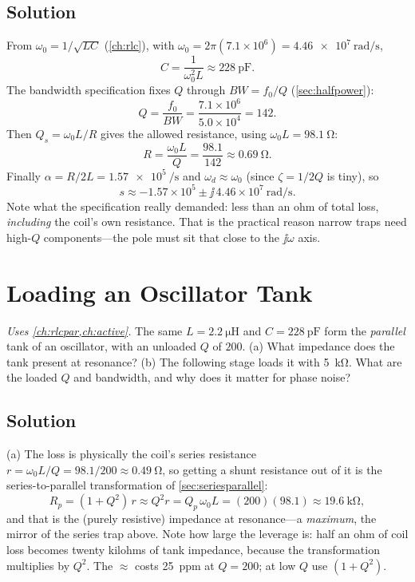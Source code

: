 \subsection*{Solution}
From \(\omega_0=1/\sqrt{LC}\) (\cref{ch:rlc}), with
\(\omega_0=2\pi(7.1\times10^6)=\SI{4.46e7}{\radian\per\second}\),
\[
C=\frac{1}{\omega_0^2L}\approx\SI{228}{\pico\farad}.
\]
The bandwidth specification fixes \(Q\) through \(BW=f_0/Q\) (\cref{sec:halfpower}):
\[
Q=\frac{f_0}{BW}=\frac{7.1\times10^6}{5.0\times10^4}=142 .
\]
Then \(Q_s=\omega_0L/R\) gives the allowed resistance, using
\(\omega_0L=\SI{98.1}{\ohm}\):
\[
R=\frac{\omega_0L}{Q}=\frac{98.1}{142}\approx\SI{0.69}{\ohm}.
\]
Finally \(\alpha=R/2L=\SI{1.57e5}{\per\second}\) and \(\omega_d\approx\omega_0\)
(since \(\zeta=1/2Q\) is tiny), so
\[
s\approx-1.57\times10^{5}\pm\jj\,4.46\times10^{7}\ \si{\radian\per\second}.
\]
Note what the specification really demanded: less than an ohm of total loss,
\emph{including} the coil's own resistance. That is the practical reason narrow traps
need high-\(Q\) components---the pole must sit that close to the \(\jj\omega\) axis.

\section{Loading an Oscillator Tank}
\emph{Uses \cref{ch:rlcpar,ch:active}.} The same \(L=\SI{2.2}{\micro\henry}\) and
\(C=\SI{228}{\pico\farad}\) form the \emph{parallel} tank of an oscillator, with an
unloaded \(Q\) of \(200\). (a) What impedance does the tank present at resonance?
(b) The following stage loads it with \SI{5}{\kilo\ohm}. What are the loaded \(Q\) and
bandwidth, and why does it matter for phase noise?

\subsection*{Solution}
(a) The loss is physically the coil's series resistance
\(r=\omega_0L/Q=98.1/200\approx\SI{0.49}{\ohm}\), so getting a shunt resistance out of
it is the series-to-parallel transformation of \cref{sec:seriesparallel}:
\[
R_p=(1+Q^2)\,r\approx Q^2r=Q_p\,\omega_0L=(200)(98.1)\approx\SI{19.6}{\kilo\ohm},
\]
and that is the (purely resistive) impedance at resonance---a \emph{maximum}, the
mirror of the series trap above. Note how large the leverage is: half an ohm of coil
loss becomes twenty kilohms of tank impedance, because the transformation multiplies
by \(Q^2\). The \(\approx\) costs \SI{25}{ppm} at \(Q=200\); at low \(Q\) use
\((1+Q^2)\).

